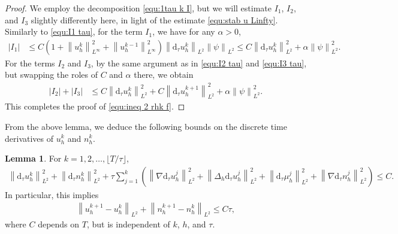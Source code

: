 \documentclass[11pt, reqno]{amsart}
\theoremstyle{definition}
\newtheorem{lemma}[theorem]{Lemma}
\numberwithin{equation}{section}
\newcommand{\dtt}{\mathrm{d}_\tau}
\newcommand{\norm}[2]{\left\|{#1}\right\|_{#2}}
\newcommand{\abs}[1]{\left|{#1}\right|}
\begin{document}
\begin{proof}
We employ the decomposition \eqref{equ:1tau k I}, but we will estimate $I_1$, $I_2$, and $I_3$ slightly differently here, in light of the estimate \eqref{equ:stab u Linfty}. Similarly to \eqref{equ:I1 tau}, for the term $I_1$, we have for any $\alpha>0$,
\begin{align*}
	\abs{I_1}
	&\leq
	C \left(1+\norm{u_h^k}{L^\infty}^2 + \norm{u_h^{k-1}}{L^\infty}^2\right) \norm{\dtt u_h^k}{L^2} \norm{\psi}{L^2}
	\leq
	C\norm{\dtt u_h^k}{L^2}^2 + \alpha \norm{\psi}{L^2}^2.
\end{align*}
For the terms $I_2$ and $I_3$, by the same argument as in \eqref{equ:I2 tau} and \eqref{equ:I3 tau}, but swapping the roles of $C$ and $\alpha$ there, we obtain
\begin{align*}
	\abs{I_2}+\abs{I_3}
	&\leq
	C\norm{\dtt u_h^k}{L^2}^2 + C\norm{\dtt u_h^{k+1}}{L^2}^2 + \alpha \norm{\psi}{L^2}^2.
\end{align*}
This completes the proof of \eqref{equ:ineq 2 rhk f}.
\end{proof}

From the above lemma, we deduce the following bounds on the discrete time derivatives of $u_h^k$ and $n_h^k$.

\begin{lemma}
For $k=1,2,\ldots, \lfloor T/\tau \rfloor$,
	\begin{align}\label{equ:stab dtu L2}
		\norm{\dtt u_h^k}{L^2}^2
		+
		\norm{\dtt n_h^k}{L^2}^2
		+
		\tau \sum_{j=1}^k \left(\norm{\nabla \dtt u_h^j}{L^2}^2 + \norm{\Delta_h \dtt u_h^j}{L^2}^2 + \norm{\dtt \mu_h^j}{L^2}^2 + \norm{\nabla \dtt n_h^j}{L^2}^2 \right) 
		\leq C.
	\end{align}
	In particular, this implies
	\begin{align}\label{equ:stab uk1 uk L2}
		\norm{u_h^{k+1}-u_h^k}{L^2} + \norm{n_h^{k+1}-n_h^k}{L^2} \leq C\tau,
	\end{align}
	where $C$ depends on $T$, but is independent of $k$, $h$, and $\tau$.
\end{lemma}
\end{document}
